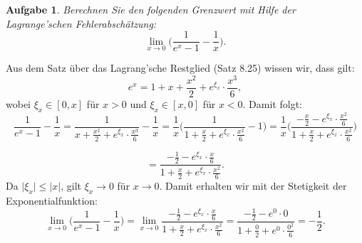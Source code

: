 \documentclass[a4paper, 20]{exam}
\newtheorem{ex}{Aufgabe}
\begin{document}
\begin{ex} Berechnen Sie den folgenden Grenzwert mit Hilfe der Lagrange'schen Fehlerabschätzung: $$ \lim_{x \rightarrow 0} \bigg( \frac{1}{e^x-1} - \frac{1}{x} \bigg).$$
\end{ex}

\begin{solution}
Aus dem Satz \"uber das Lagrang'sche Restglied (Satz 8.25) wissen wir, dass gilt:
$$ e^x= 1 + x + \frac{x^2}{2} + e^{\xi_x} \cdot \frac{x^3}{6},$$
wobei $\xi_x \in [0,x]$ f\"ur $x>0$ und $\xi_x \in [x,0]$ f\"ur $x<0$. Damit folgt:
$$  \frac{1}{e^x-1} - \frac{1}{x} 
=  \frac{1}{x + \frac{x^2}{2} + e^{\xi_x} \cdot \frac{x^3}{6}} - \frac{1}{x} 
= \frac{1}{x} \bigg( \frac{1}{1 + \frac{x}{2} + e^{\xi_x} \cdot \frac{x^2}{6}} - 1 \bigg)
= \frac{1}{x} \bigg( \frac{-\frac{x}{2} - e^{\xi_x} \cdot \frac{x^2}{6}}{1 + \frac{x}{2} + e^{\xi_x} \cdot \frac{x^2}{6}} \bigg)$$

$$=  \frac{-\frac{1}{2} - e^{\xi_x} \cdot \frac{x}{6}}{1 + \frac{x}{2} + e^{\xi_x} \cdot \frac{x^2}{6}}.$$
Da $\vert \xi_x \vert\leq \vert x \vert$, gilt $\xi_x \longrightarrow 0$ f\"ur $x \longrightarrow 0$. Damit erhalten wir mit der Stetigkeit der Exponentialfunktion:
$$ \lim_{x \rightarrow 0} \bigg( \frac{1}{e^x-1} - \frac{1}{x} \bigg)
=   \lim_{x \rightarrow 0}  \frac{-\frac{1}{2} - e^{\xi_x} \cdot \frac{x}{6}}{1 + \frac{x}{2} + e^{\xi_x} \cdot \frac{x^2}{6}} 
=  \frac{-\frac{1}{2}- e^0\cdot 0}{1+ \frac{0}{2} + e^0\cdot \frac{0^2}{6} }
= -\frac{1}{2}.$$
\end{solution}

\newpage 
\end{document}
